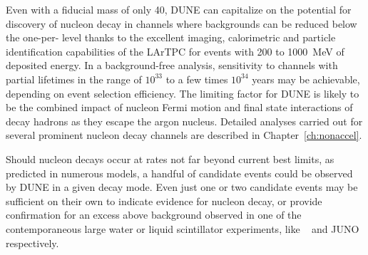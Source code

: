 Even with a fiducial mass of only \SI{40}{\kt}, DUNE can capitalize on the 
potential for discovery of nucleon decay in channels where backgrounds 
can be reduced below the one-per-\si{\Mtyr} level thanks to the 
excellent imaging, calorimetric and particle identification capabilities 
of the LArTPC for events with 200 to \SI{1000}{\MeV} of deposited energy.  
In a background-free analysis, sensitivity to channels with partial lifetimes 
in the range of $10^{33}$ to a few times $10^{34}$ \si{years} may be achievable, 
depending on event selection efficiency.  The limiting factor for DUNE 
is likely to be the combined impact of nucleon Fermi motion and final state 
interactions of decay hadrons as they escape the argon nucleus.  Detailed 
analyses carried out for several prominent nucleon decay channels are 
described in Chapter~\ref{ch:nonaccel}.

Should nucleon decays occur at rates not far beyond current best limits, 
as predicted in numerous  models, a handful of candidate 
events could be observed by DUNE in a given decay mode.  
Even just one or two candidate events may be 
sufficient on their own to indicate evidence for nucleon decay, 
or provide confirmation 
for an excess above background observed in one of the contemporaneous 
large water or liquid scintillator experiments, like \hyperk~\cite{Abe:2018uyc}
and JUNO~\cite{Djurcic:2015vqa,An:2015jdp} respectively.
